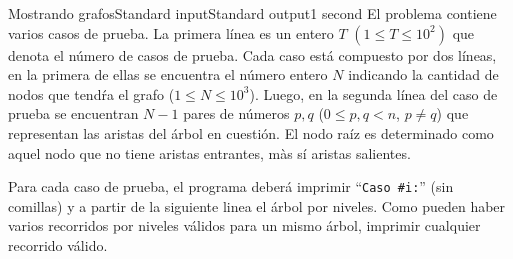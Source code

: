 \begin{problem}{Mostrando grafos}{Standard input}{Standard output}{1 second}{}
\InputFile
El problema contiene varios casos de prueba. La primera l\'inea es un entero $T$ $(1\leq T \leq 10^2)$ que denota el número de casos de prueba. Cada caso está compuesto por dos l\'ineas, en la primera de ellas se encuentra el n\'umero entero $N$ indicando la cantidad de nodos que tend\'ra el grafo ($1 \leq N \leq 10^3$). Luego, en la segunda l\'inea del caso de prueba se encuentran $N-1$ pares de n\'umeros $p, q$ ($0 \leq p, q < n$, $p \neq q$) que representan las aristas del \'arbol en cuesti\'on. El nodo ra\'iz es determinado como aquel nodo que no tiene aristas entrantes, m\`as s\'i aristas salientes.

\OutputFile
Para cada caso de prueba, el programa deber\'a imprimir ``\texttt{Caso \#i:}'' (sin comillas) y a partir de la siguiente linea el árbol por niveles. Como pueden haber varios recorridos por niveles válidos para un mismo árbol, imprimir cualquier recorrido válido.

\Example

\begin{example}
\end{example}

\end{problem}
